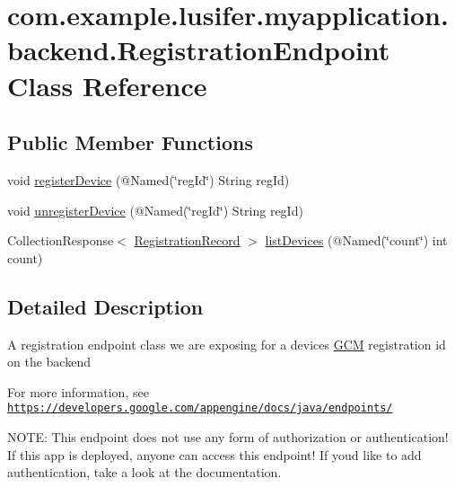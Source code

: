 \hypertarget{classcom_1_1example_1_1lusifer_1_1myapplication_1_1backend_1_1_registration_endpoint}{}\section{com.\+example.\+lusifer.\+myapplication.\+backend.\+Registration\+Endpoint Class Reference}
\label{classcom_1_1example_1_1lusifer_1_1myapplication_1_1backend_1_1_registration_endpoint}
\subsection*{Public Member Functions}
\begin{DoxyCompactItemize}
\item 
void \hyperlink{classcom_1_1example_1_1lusifer_1_1myapplication_1_1backend_1_1_registration_endpoint_a82f4fa1f68e580bee5893ece486e2b53}{register\+Device} (@Named(\char`\"{}reg\+Id\char`\"{}) String reg\+Id)
\item 
void \hyperlink{classcom_1_1example_1_1lusifer_1_1myapplication_1_1backend_1_1_registration_endpoint_ab5076a535feedc7c197fc6dffeb595e8}{unregister\+Device} (@Named(\char`\"{}reg\+Id\char`\"{}) String reg\+Id)
\item 
Collection\+Response$<$ \hyperlink{classcom_1_1example_1_1lusifer_1_1myapplication_1_1backend_1_1_registration_record}{Registration\+Record} $>$ \hyperlink{classcom_1_1example_1_1lusifer_1_1myapplication_1_1backend_1_1_registration_endpoint_a54eda87a4f4c1cea9a4b5694033152b1}{list\+Devices} (@Named(\char`\"{}count\char`\"{}) int count)
\end{DoxyCompactItemize}


\subsection{Detailed Description}
A registration endpoint class we are exposing for a device\textquotesingle{}s \hyperlink{class_g_c_m}{G\+C\+M} registration id on the backend 

For more information, see \href{https://developers.google.com/appengine/docs/java/endpoints/}{\tt https\+://developers.\+google.\+com/appengine/docs/java/endpoints/} 

N\+O\+T\+E\+: This endpoint does not use any form of authorization or authentication! If this app is deployed, anyone can access this endpoint! If you\textquotesingle{}d like to add authentication, take a look at the documentation. 

